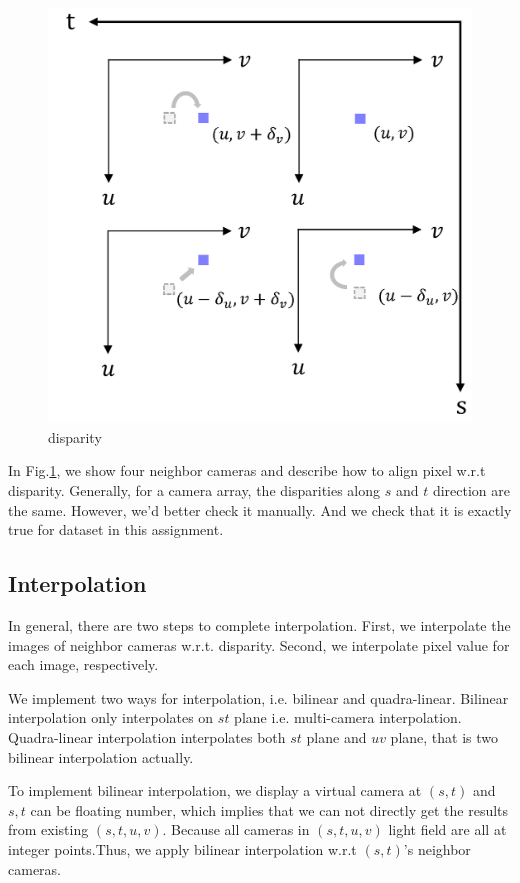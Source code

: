 \documentclass[acmtog]{acmart}
\begin{document}
	\begin{figure}[h]
		\centering
		\includegraphics[scale=0.14]{disparity.png}
		\caption{disparity}
		\label{fig:Fig2}
	\end{figure}

	\quad In Fig.\ref{fig:Fig2}, we show four neighbor cameras and describe how to align pixel w.r.t disparity. Generally, for a camera array, the disparities along $s$ and $t$ direction are the same. However, we'd better check it manually. And we check that it is exactly true for dataset in this assignment.
	
	\subsection{Interpolation}
	\quad In general, there are two steps to complete interpolation. First, we interpolate the images of neighbor cameras w.r.t. disparity. Second, we interpolate pixel value for each image, respectively. 
		 
	\quad We implement two ways for interpolation, i.e. bilinear and quadra-linear. Bilinear interpolation only interpolates on $st$ plane i.e. multi-camera interpolation. Quadra-linear interpolation interpolates both $st$ plane and $uv$ plane, that is two bilinear interpolation actually.
	
	\quad To implement bilinear interpolation, we display a virtual camera at $(s,t)$ and $s,t$ can be floating number, which implies that we can not directly get the results from existing $(s,t,u,v)$. Because all cameras in $(s,t,u,v)$ light field are all at integer points.Thus, we apply bilinear interpolation w.r.t $(s,t)$'s neighbor cameras. 
	
\end{document}
